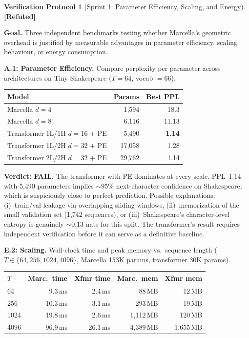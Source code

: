 \documentclass[11pt,a4paper]{article}
\theoremstyle{definition}
\newtheorem{protocol}[theorem]{Verification Protocol}
\theoremstyle{remark}
\newcommand{\statusrefuted}{\textcolor{red!90!black}{\textbf{[Refuted]}}}
\begin{document}
\begin{protocol}[Sprint 1: Parameter Efficiency, Scaling, 
and Energy]\label{prot:sprint1}
\statusrefuted

\textbf{Goal.} Three independent benchmarks testing whether 
Marcella's geometric overhead is justified by measurable 
advantages in parameter efficiency, scaling behaviour, or 
energy consumption.

\textbf{A.1: Parameter Efficiency.} Compare perplexity per 
parameter across architectures on Tiny Shakespeare ($T = 64$, 
vocab $= 66$).

\begin{center}
\begin{tabular}{lrr}
\toprule
Model & Params & Best PPL \\
\midrule
Marcella $d = 4$ & 1{,}594 & 18.3 \\
Marcella $d = 8$ & 6{,}116 & 11.13 \\
Transformer 1L/1H $d = 16$ + PE & 5{,}490 & \textbf{1.14} \\
Transformer 1L/2H $d = 32$ + PE & 17{,}058 & 1.28 \\
Transformer 2L/2H $d = 32$ + PE & 29{,}762 & 1.14 \\
\bottomrule
\end{tabular}
\end{center}

\textbf{Verdict: FAIL.} The transformer with PE dominates at 
every scale. PPL~$1.14$ with 5{,}490 parameters implies 
${\sim}95\%$ next-character confidence on Shakespeare, which is 
suspiciously close to perfect prediction. Possible explanations: 
(i)~train/val leakage via overlapping sliding windows, 
(ii)~memorization of the small validation set (1{,}742 sequences), 
or (iii)~Shakespeare's character-level entropy is genuinely 
${\sim}0.13$ nats for this split. The transformer's result 
requires independent verification before it can serve as a 
definitive baseline.

\textbf{E.2: Scaling.} Wall-clock time and peak memory vs.\ 
sequence length ($T \in \{64, 256, 1024, 4096\}$, Marcella 
153K params, transformer 30K params).

\begin{center}
\begin{tabular}{lrrrr}
\toprule
$T$ & Marc.\ time & Xfmr time & Marc.\ mem & Xfmr mem \\
\midrule
64   & 9.3\,ms  & 2.4\,ms  & 88\,MB    & 12\,MB \\
256  & 10.3\,ms & 3.1\,ms  & 293\,MB   & 19\,MB \\
1024 & 19.8\,ms & 2.6\,ms  & 1{,}112\,MB & 120\,MB \\
4096 & 96.9\,ms & 26.1\,ms & 4{,}389\,MB & 1{,}655\,MB \\
\bottomrule
\end{tabular}
\end{center}


\end{protocol}
\end{document}
